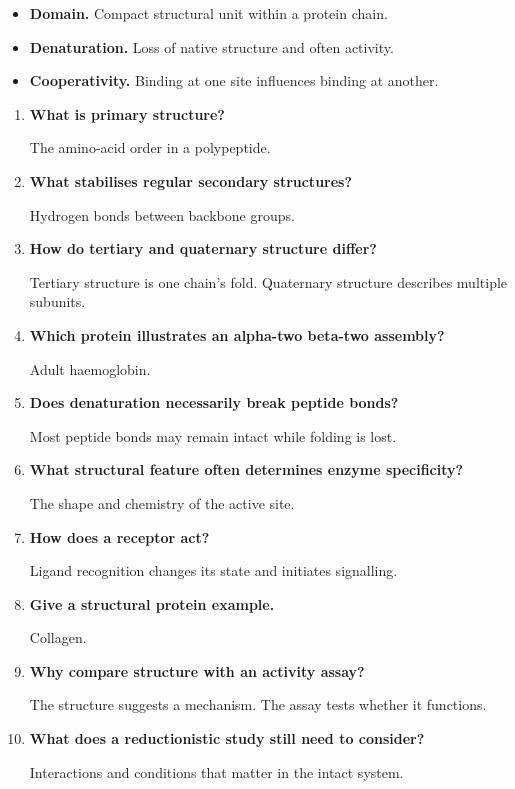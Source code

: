 \documentclass[12pt,a4paper]{article}
\newcommand{\Q}[1]{\textbf{#1}\par\noindent\ignorespaces}
\begin{document}
\begin{tcolorbox}[defbox, title={One-Line Definitions}]
\begin{itemize}[leftmargin=*, itemsep=3pt, topsep=4pt]
  \item \textbf{Domain.} Compact structural unit within a protein chain.
  \item \textbf{Denaturation.} Loss of native structure and often activity.
  \item \textbf{Cooperativity.} Binding at one site influences binding at another.
\end{itemize}
\end{tcolorbox}

\begin{tcolorbox}[exambox, title={Frequently Asked / Viva Questions}]
\begin{enumerate}[topsep=0pt, label=\textbf{Q\arabic*.}, itemsep=5pt, leftmargin=*]
  \item \Q{What is primary structure?}
    The amino-acid order in a polypeptide.
  \item \Q{What stabilises regular secondary structures?}
    Hydrogen bonds between backbone groups.
  \item \Q{How do tertiary and quaternary structure differ?}
    Tertiary structure is one chain's fold. Quaternary structure describes multiple subunits.
  \item \Q{Which protein illustrates an alpha-two beta-two assembly?}
    Adult haemoglobin.
  \item \Q{Does denaturation necessarily break peptide bonds?}
    Most peptide bonds may remain intact while folding is lost.
  \item \Q{What structural feature often determines enzyme specificity?}
    The shape and chemistry of the active site.
  \item \Q{How does a receptor act?}
    Ligand recognition changes its state and initiates signalling.
  \item \Q{Give a structural protein example.}
    Collagen.
  \item \Q{Why compare structure with an activity assay?}
    The structure suggests a mechanism. The assay tests whether it functions.
  \item \Q{What does a reductionistic study still need to consider?}
    Interactions and conditions that matter in the intact system.
\end{enumerate}
\end{tcolorbox}
\end{document}
